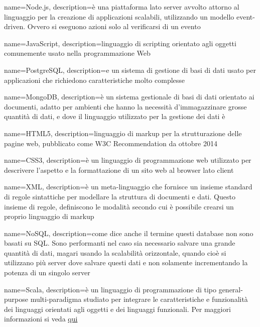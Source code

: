  {
	name=Node.js,
	description={è una piattaforma lato server avvolto attorno al linguaggio  per la creazione di applicazioni scalabili, utilizzando un modello event-driven. Ovvero si eseguono azioni solo al verificarsi di un evento }
}

 {
	name=JavaScript,
	description={linguaggio di scripting orientato agli oggetti comunemente usato nella programmazione Web}
}

 {
	name=PostgreSQL,
	description={e un sistema di gestione di basi di dati  usato per applicazioni che richiedono caratteristiche molto complesse }
}

 {
	name=MongoDB,
	description={è un sistema gestionale di basi di dati  orientato ai documenti, adatto per ambienti che hanno la necessità d'immagazzinare grosse quantità di dati, e dove il linguaggio utilizzato per la gestione dei dati è }
}

 {
	name=HTML5,
	description={linguaggio di markup per la strutturazione delle pagine web, pubblicato come W3C Recommendation da ottobre 2014}
}

 {
	name=CSS3,
	description={è un linguaggio di programmazione web utilizzato per descrivere l'aspetto e la formattazione di un sito web al browser lato client}
}

 {
	name=XML,
	description={è un meta-linguaggio che fornisce un insieme standard di regole sintattiche per modellare la struttura di documenti e dati. Questo insieme di regole, definiscono le modalità secondo cui è possibile crearsi un proprio linguaggio di markup}
}

 {
	name=NoSQL,
	description={come dice anche il termine questi database non sono basati su SQL. Sono performanti nel caso sia necessario salvare una grande quantità di dati, magari usando la scalabilità orizzontale, quando cioè si utilizzano più server dove salvare questi dati e non solamente incrementando la potenza di un singolo server}
}

 {
	name=Scala,
	description={è un linguaggio di programmazione di tipo general-purpose multi-paradigma studiato per integrare le caratteristiche e funzionalità dei linguaggi orientati agli oggetti e dei linguaggi funzionali. Per maggiori informazioni si veda \href{https://it.wikipedia.org/wiki/Scala_(linguaggio_di_programmazione)}{qui}}
}

